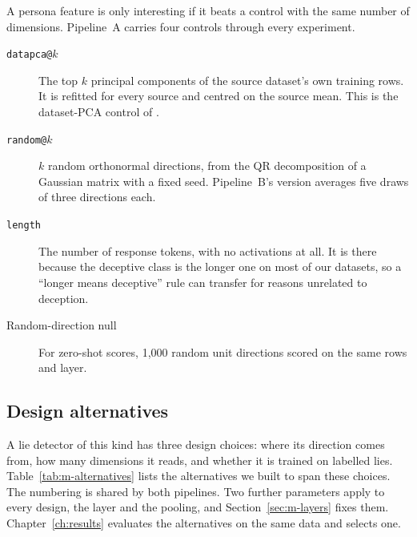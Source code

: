 A persona feature is only interesting if it beats a control with the same number of dimensions. Pipeline~A carries four controls through every experiment.
\begin{description}
\item[\texttt{datapca@}$k$] The top $k$ principal components of the source dataset's own training rows. It is refitted for every source and centred on the source mean. This is the dataset-PCA control of \textcite[p.~4]{mahadik2026persona}. %
\item[\texttt{random@}$k$] $k$ random orthonormal directions, from the QR decomposition of a Gaussian matrix with a fixed seed. %
Pipeline~B's version averages five draws of three directions each. %
\item[\texttt{length}] The number of response tokens, with no activations at all. It is there because the deceptive class is the longer one on most of our datasets, so a ``longer means deceptive'' rule can transfer for reasons unrelated to deception. %
\item[Random-direction null] For zero-shot scores, 1{,}000 random unit directions scored on the same rows and layer. %
\end{description}

\subsection{Design alternatives}
\label{sec:m-alternatives}

A lie detector of this kind has three design choices: where its direction comes from, how many dimensions it reads, and whether it is trained on labelled lies. Table~\ref{tab:m-alternatives} lists the alternatives we built to span these choices. The numbering is shared by both pipelines. Two further parameters apply to every design, the layer and the pooling, and Section~\ref{sec:m-layers} fixes them. Chapter~\ref{ch:results} evaluates the alternatives on the same data and selects one.

